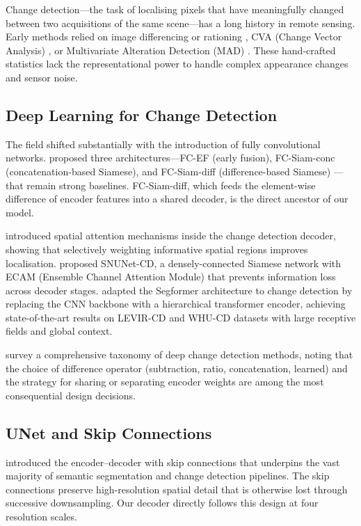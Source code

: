 \documentclass[12pt,a4paper]{article}
\begin{document}
Change detection---the task of localising pixels that have meaningfully changed between
two acquisitions of the same scene---has a long history in remote sensing.  Early methods
relied on image differencing or rationing \citep{singh1989digital}, CVA (Change Vector
Analysis) \citep{malila1980change}, or Multivariate Alteration Detection (MAD)
\citep{nielsen1998multivariate}.  These hand-crafted statistics lack the representational
power to handle complex appearance changes and sensor noise.

\subsection{Deep Learning for Change Detection}

The field shifted substantially with the introduction of fully convolutional networks.
\citet{daudt2018fully} proposed three architectures---FC-EF (early fusion),
FC-Siam-conc (concatenation-based Siamese), and FC-Siam-diff (difference-based Siamese)
---that remain strong baselines.  FC-Siam-diff, which feeds the element-wise difference
of encoder features into a shared decoder, is the direct ancestor of our model.

\citet{chen2020spatial} introduced spatial attention mechanisms inside the change
detection decoder, showing that selectively weighting informative spatial regions improves
localisation.  \citet{fang2021snunet} proposed SNUNet-CD, a densely-connected Siamese
network with ECAM (Ensemble Channel Attention Module) that prevents information loss
across decoder stages.  \citet{changeformer2022} adapted the Segformer
\citep{xie2021segformer} architecture to change detection by replacing the CNN backbone
with a hierarchical transformer encoder, achieving state-of-the-art results on LEVIR-CD
and WHU-CD datasets with large receptive fields and global context.

\citet{chen2021remote} survey a comprehensive taxonomy of deep change detection methods,
noting that the choice of difference operator (subtraction, ratio, concatenation, learned)
and the strategy for sharing or separating encoder weights are among the most consequential
design decisions.

\subsection{UNet and Skip Connections}

\citet{ronneberger2015unet} introduced the encoder--decoder with skip connections that
underpins the vast majority of semantic segmentation and change detection pipelines.  The
skip connections preserve high-resolution spatial detail that is otherwise lost through
successive downsampling.  Our decoder directly follows this design at four resolution
scales.
\end{document}
